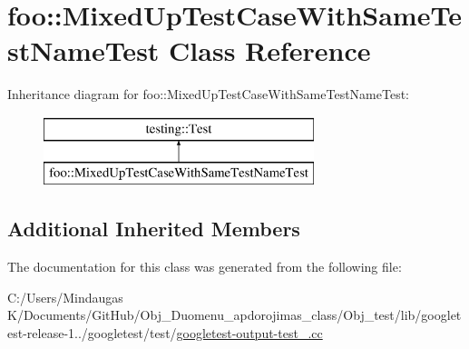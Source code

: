 \hypertarget{classfoo_1_1_mixed_up_test_case_with_same_test_name_test}{}\section{foo\+::Mixed\+Up\+Test\+Case\+With\+Same\+Test\+Name\+Test Class Reference}
\label{classfoo_1_1_mixed_up_test_case_with_same_test_name_test}
Inheritance diagram for foo\+::Mixed\+Up\+Test\+Case\+With\+Same\+Test\+Name\+Test\+:\begin{figure}[H]
\begin{center}
\leavevmode
\includegraphics[height=2.000000cm]{d1/da8/classfoo_1_1_mixed_up_test_case_with_same_test_name_test}
\end{center}
\end{figure}
\subsection*{Additional Inherited Members}


The documentation for this class was generated from the following file\+:\begin{DoxyCompactItemize}
\item 
C\+:/\+Users/\+Mindaugas K/\+Documents/\+Git\+Hub/\+Obj\+\_\+\+Duomenu\+\_\+apdorojimas\+\_\+class/\+Obj\+\_\+test/lib/googletest-\/release-\/1../googletest/test/\mbox{\hyperlink{_obj__test_2lib_2googletest-release-1_88_81_2googletest_2test_2googletest-output-test___8cc}{googletest-\/output-\/test\+\_\+.\+cc}}\end{DoxyCompactItemize}
